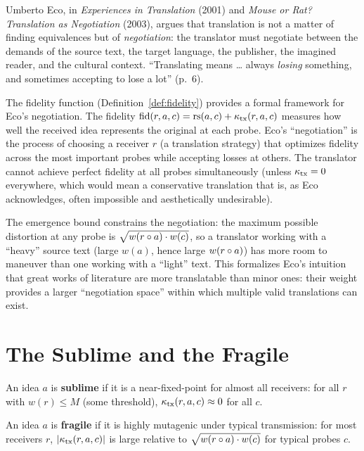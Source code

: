 \begin{interpretation}\label{interp:ch7:eco_translation}
Umberto Eco, in \emph{Experiences in Translation} (2001) and \emph{Mouse
or Rat? Translation as Negotiation} (2003), argues that translation is
not a matter of finding equivalences but of \emph{negotiation}: the
translator must negotiate between the demands of the source text, the
target language, the publisher, the imagined reader, and the cultural
context. ``Translating means \ldots{} always \emph{losing} something, and
sometimes accepting to lose a lot'' (p.~6).

The fidelity function (Definition~\ref{def:fidelity}) provides a formal
framework for Eco's negotiation. The fidelity $\text{fid}(r, a, c) =
\mathrm{rs}(a, c) + \kappa_{\text{tx}}(r, a, c)$ measures how well the
received idea represents the original at each probe. Eco's ``negotiation''
is the process of choosing a receiver $r$ (a translation strategy) that
optimizes fidelity across the most important probes while accepting
losses at others. The translator cannot achieve perfect fidelity at all
probes simultaneously (unless $\kappa_{\text{tx}} = 0$ everywhere,
which would mean a conservative translation that is, as Eco acknowledges,
often impossible and aesthetically undesirable).

The emergence bound constrains the negotiation: the maximum possible
distortion at any probe is $\sqrt{w(r \circ a) \cdot w(c)}$, so a
translator working with a ``heavy'' source text (large $w(a)$, hence
large $w(r \circ a)$) has more room to maneuver than one working
with a ``light'' text. This formalizes Eco's intuition that great works
of literature are more translatable than minor ones: their weight
provides a larger ``negotiation space'' within which multiple valid
translations can exist.
\end{interpretation}

\section{The Sublime and the Fragile}

\begin{definition}
An idea $a$ is \textbf{sublime} if it is a near-fixed-point for almost
all receivers: for all $r$ with $w(r) \leq M$ (some threshold),
$\kappa_{\mathrm{tx}}(r, a, c) \approx 0$ for all $c$.
\end{definition}

\begin{definition}
An idea $a$ is \textbf{fragile} if it is highly mutagenic under typical
transmission: for most receivers $r$,
$|\kappa_{\mathrm{tx}}(r, a, c)|$ is large relative to $\sqrt{w(r
\circ a) \cdot w(c)}$ for typical probes $c$.
\end{definition}

